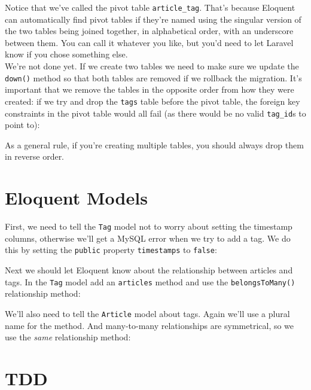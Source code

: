 
Notice that we've called the pivot table \texttt{article\_tag}. That's because Eloquent can automatically find pivot tables if they're named using the singular version of the two tables being joined together, in alphabetical order, with an underscore between them. You can call it whatever you like, but you'd need to let Laravel know if you chose something else.
\\

We're not done yet. If we create two tables we need to make sure we update the \texttt{down()} method so that both tables are removed if we rollback the migration. It's important that we remove the tables in the opposite order from how they were created: if we try and drop the \texttt{tags} table before the pivot table, the foreign key constraints in the pivot table would all fail (as there would be no valid \texttt{tag\_id}s to point to):


As a general rule, if you're creating multiple tables, you should always drop them in reverse order.


\section{Eloquent Models}

First, we need to tell the \texttt{Tag} model not to worry about setting the timestamp columns, otherwise we'll get a MySQL error when we try to add a tag. We do this by setting the \texttt{public} property \texttt{timestamps} to \texttt{false}:


Next we should let Eloquent know about the relationship between articles and tags. In the \texttt{Tag} model add an \texttt{articles} method and use the \texttt{belongsToMany()} relationship method:


We'll also need to tell the \texttt{Article} model about tags. Again we'll use a plural name for the method. And many-to-many relationships are symmetrical, so we use the \textit{same} relationship method:



\section{TDD}

